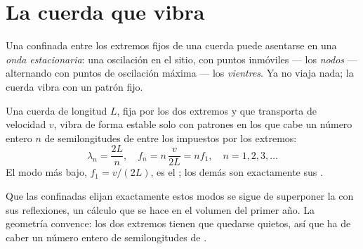 \section{La cuerda que vibra}

\begin{definition}\label{def:g12:sound-acoustics:standing-wave}
Una  confinada entre los extremos fijos de una cuerda puede
asentarse en una \emph{onda estacionaria}: una
oscilación en el sitio, con puntos inmóviles --- los
\emph{nodos} --- alternando con puntos de oscilación máxima
--- los \emph{vientres}. Ya no viaja nada; la cuerda
vibra con un patrón fijo.
\end{definition}

\begin{proposition}\label{prop:g12:sound-acoustics:string-modes}
Una cuerda de longitud $L$, fija por los dos extremos y que transporta
 de velocidad $v$, vibra de forma estable solo con patrones en los
que cabe un número entero $n$ de semilongitudes de  entre los 
impuestos por los extremos:
\[ \lambda_n = \frac{2L}{n}, \quad f_n = n\,\frac{v}{2L} = n f_1, \quad n = 1, 2, 3, \dots \]
El modo más bajo, $f_1 = v/(2L)$, es el ; los demás son
exactamente sus . \admitted
\end{proposition}

\begin{remark}\label{rem:g12:sound-acoustics:honest}
Que las  confinadas elijan exactamente estos modos se sigue de
superponer la  con sus reflexiones, un cálculo que se hace en el
volumen del primer año. La geometría convence: los dos extremos tienen
que quedarse quietos, así que ha de caber un número entero de
semilongitudes de .
\end{remark}

